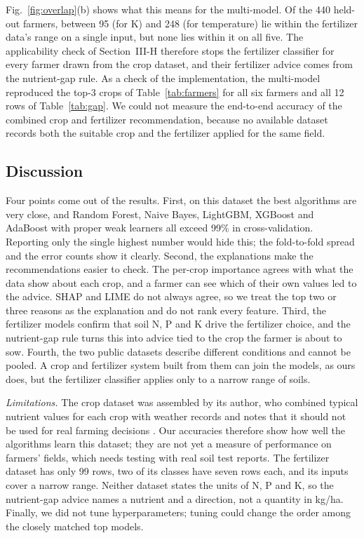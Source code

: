 \documentclass[conference]{IEEEtran}
\begin{document}
Fig.~\ref{fig:overlap}(b) shows what this means for the multi-model. Of the 440 held-out farmers, between 95 (for K) and 248 (for temperature) lie within the fertilizer data's range on a single input, but none lies within it on all five. The applicability check of Section~III-H therefore stops the fertilizer classifier for every farmer drawn from the crop dataset, and their fertilizer advice comes from the nutrient-gap rule. As a check of the implementation, the multi-model reproduced the top-3 crops of Table~\ref{tab:farmers} for all six farmers and all 12 rows of Table~\ref{tab:gap}. We could not measure the end-to-end accuracy of the combined crop and fertilizer recommendation, because no available dataset records both the suitable crop and the fertilizer applied for the same field.

\subsection{Discussion}

Four points come out of the results. First, on this dataset the best algorithms are very close, and Random Forest, Naive Bayes, LightGBM, XGBoost and AdaBoost with proper weak learners all exceed 99\% in cross-validation. Reporting only the single highest number would hide this; the fold-to-fold spread and the error counts show it clearly. Second, the explanations make the recommendations easier to check. The per-crop importance agrees with what the data show about each crop, and a farmer can see which of their own values led to the advice. SHAP and LIME do not always agree, so we treat the top two or three reasons as the explanation and do not rank every feature. Third, the fertilizer models confirm that soil N, P and K drive the fertilizer choice, and the nutrient-gap rule turns this into advice tied to the crop the farmer is about to sow. Fourth, the two public datasets describe different conditions and cannot be pooled. A crop and fertilizer system built from them can join the models, as ours does, but the fertilizer classifier applies only to a narrow range of soils.

\textit{Limitations.} The crop dataset was assembled by its author, who combined typical nutrient values for each crop with weather records and notes that it should not be used for real farming decisions \cite{harvestify}. Our accuracies therefore show how well the algorithms learn this dataset; they are not yet a measure of performance on farmers' fields, which needs testing with real soil test reports. The fertilizer dataset has only 99 rows, two of its classes have seven rows each, and its inputs cover a narrow range. Neither dataset states the units of N, P and K, so the nutrient-gap advice names a nutrient and a direction, not a quantity in kg/ha. Finally, we did not tune hyperparameters; tuning could change the order among the closely matched top models.
\end{document}
